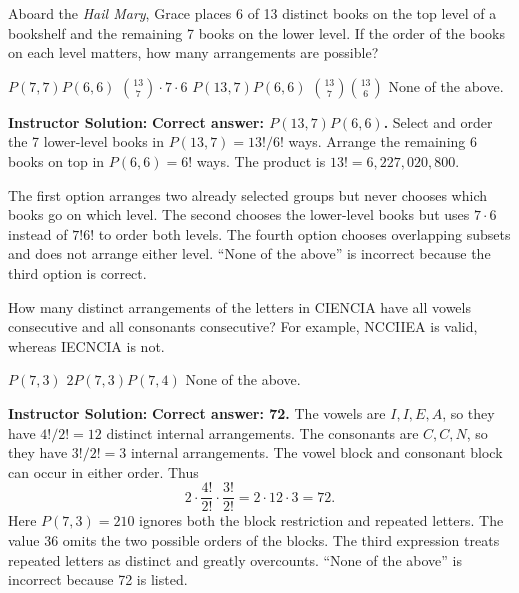 \documentclass[11pt,addpoints]{exam}
\renewenvironment{solution}
{\par\medskip\noindent\hrulefill\par\smallskip\noindent\textbf{Instructor Solution:}\enspace\ignorespaces}
{\par\smallskip\noindent\hrulefill\par\medskip}
\begin{document}
\begin{questions}
\newpage

\question[5] Aboard the \textit{Hail Mary}, Grace places 6 of 13 distinct books on the top level of a bookshelf and the remaining 7 books on the lower level. If the order of the books on each level matters, how many arrangements are possible?
\begin{choices}
    \choice $P(7,7)P(6,6)$
    \choice $\binom{13}{7}\cdot7\cdot6$
    \CorrectChoice $P(13,7)P(6,6)$
    \choice $\binom{13}{7}\binom{13}{6}$
    \choice None of the above.
\end{choices}
\begin{solution}
\textbf{Correct answer: $P(13,7)P(6,6)$.} Select and order the 7 lower-level books in $P(13,7)=13!/6!$ ways. Arrange the remaining 6 books on top in $P(6,6)=6!$ ways. The product is $13!=6{,}227{,}020{,}800$.

The first option arranges two already selected groups but never chooses which books go on which level. The second chooses the lower-level books but uses $7\cdot6$ instead of $7!6!$ to order both levels. The fourth option chooses overlapping subsets and does not arrange either level. ``None of the above'' is incorrect because the third option is correct.
\end{solution}

\question[5] How many distinct arrangements of the letters in \textsc{CIENCIA} have all vowels consecutive and all consonants consecutive? For example, \textsc{NCCIIEA} is valid, whereas \textsc{IECNCIA} is not.
\begin{choices}
    \choice $P(7,3)$
    \choice $2P(7,3)P(7,4)$
    \choice None of the above.
\end{choices}
\begin{solution}
\textbf{Correct answer: 72.} The vowels are $I,I,E,A$, so they have $4!/2!=12$ distinct internal arrangements. The consonants are $C,C,N$, so they have $3!/2!=3$ internal arrangements. The vowel block and consonant block can occur in either order. Thus
\[
2\cdot\frac{4!}{2!}\cdot\frac{3!}{2!}=2\cdot12\cdot3=72.
\]
Here $P(7,3)=210$ ignores both the block restriction and repeated letters. The value 36 omits the two possible orders of the blocks. The third expression treats repeated letters as distinct and greatly overcounts. ``None of the above'' is incorrect because 72 is listed.
\end{solution}


\end{questions}
\end{document}
